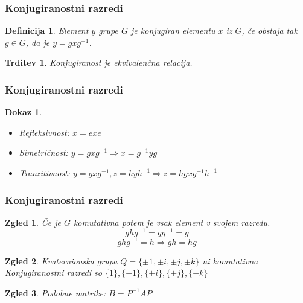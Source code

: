 \documentclass{beamer}
\newtheorem{trditev}{Trditev}
\newtheorem{definicija}{Definicija}
\newtheorem{zgled}{Zgled}
\newtheorem{dokaz}{Dokaz}
\begin{document}

\begin{frame}
\frametitle{Konjugiranostni razredi}

\begin{definicija}
    Element $y$ grupe $G$ je \emph{konjugiran} elementu $x$ iz $G$, če obstaja tak $g \in G$, da je $y = gxg^{-1}$.
\end{definicija}
\bigskip
\pause

\begin{trditev}
    Konjugiranost je ekvivalenčna relacija.
\end{trditev}

\end{frame}


\begin{frame}
\frametitle{Konjugiranostni razredi}

\begin{dokaz}
    \begin{itemize}
        \item<1->Refleksivnost: $x = exe$
        \bigskip
        \item<2->Simetričnost:  $y = gxg^{-1} \Rightarrow x = g^{-1}yg$
        \bigskip
        \item<3->Tranzitivnost: $y = gxg^{-1}, z = hyh^{-1} \Rightarrow z = hgxg^{-1}h^{-1}$
    \end{itemize}
\end{dokaz}

\end{frame}

\begin{frame}
\frametitle{Konjugiranostni razredi}

\begin{zgled}
    Če je $G$ komutativna potem je vsak element v svojem razredu.
    \medskip
    \pause
    \[ghg^{-1} = gg^{-1} = g\]
    \pause
    \[ghg^{-1} = h \Rightarrow gh = hg\]
    \pause
\end{zgled}

\begin{zgled}
    Kvaternionska grupa $Q = \{\pm 1, \pm i, \pm j, \pm k\}$ ni komutativna
    \newline
    \pause
    Konjugiranostni razredi so $\{1\}, \{-1\}, \{\pm i\}, \{\pm j\}, \{\pm k\}$
    \pause
\end{zgled}

\begin{zgled}
    Podobne matrike: $B = P^{-1}AP$
\end{zgled}

\end{frame}
\end{document}

